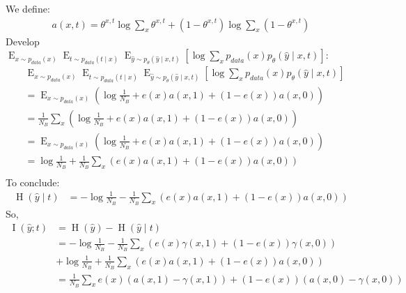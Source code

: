 \documentclass[oneside,12pt]{article}
\begin{document}
%
We define:
\begin{equation}
    \begin{split}
        a(x,t) = \theta^{x,t}\operatorname{log} \sum_x \theta^{x,t} + (1-\theta^{x,t})\operatorname{log} \sum_x (1-\theta^{x,t})
    \end{split}
\end{equation}
%
Develop $\operatorname{E}_{x \sim p_{data}(x)}
        \operatorname{E}_{t \sim p_{data}(t \mid x)}
        \operatorname{E}_{\hat{y} \sim p_\theta(\hat{y} \mid x,t)}
        \left[\operatorname{log} \sum_x p_{data}(x) p_\theta(\hat{y} \mid x,t)\right]$:
%
\begin{equation}
    \begin{split}
        &\operatorname{E}_{x \sim p_{data}(x)}
        \operatorname{E}_{t \sim p_{data}(t \mid x)}
        \operatorname{E}_{\hat{y} \sim p_\theta(\hat{y} \mid x,t)}
        \left[\operatorname{log} \sum_x p_{data}(x) p_\theta(\hat{y} \mid x,t)\right]\\
        &= \operatorname{E}_{x \sim p_{data}(x)}\left(\operatorname{log} \frac{1}{N_B} + e(x)a(x,1) + (1-e(x))a(x,0)\right)\\
        &= \frac{1}{N_B} \sum_x \left(\operatorname{log} \frac{1}{N_B} + e(x)a(x,1) + (1-e(x))a(x,0)\right)\\
        &= \operatorname{E}_{x \sim p_{data}(x)}\left(\operatorname{log} \frac{1}{N_B} + e(x)a(x,1) + (1-e(x))a(x,0)\right)\\
        &= \operatorname{log} \frac{1}{N_B} + \frac{1}{N_B} \sum_x \left(e(x)a(x,1) + (1-e(x))a(x,0)\right)\\
    \end{split}
\end{equation}
%
To conclude:
\begin{equation}
    \begin{split}
        \operatorname{H}(\hat{y} \mid t) &= -\operatorname{log} \frac{1}{N_B} - \frac{1}{N_B} \sum_x \left(e(x)a(x,1) + (1-e(x))a(x,0)\right)
    \end{split}
\end{equation}
%
So,
\begin{equation}
    \begin{split}
        \operatorname{I}(\hat{y}; t) &= \operatorname{H}(\hat{y}) - \operatorname{H}(\hat{y} \mid t)\\
        &= - \operatorname{log}\frac{1}{N_B} - \frac{1}{N_B} \sum_x \left(e(x)\gamma(x,1) + (1-e(x))\gamma(x,0)\right)\\
        &+\operatorname{log} \frac{1}{N_B} + \frac{1}{N_B} \sum_x \left(e(x)a(x,1) + (1-e(x))a(x,0)\right)\\
        &= \frac{1}{N_B} \sum_x e(x)\left(a(x,1)-\gamma(x,1)\right) + (1-e(x))\left(a(x,0)-\gamma(x,0)\right)
    \end{split}
\end{equation}
\end{document}
